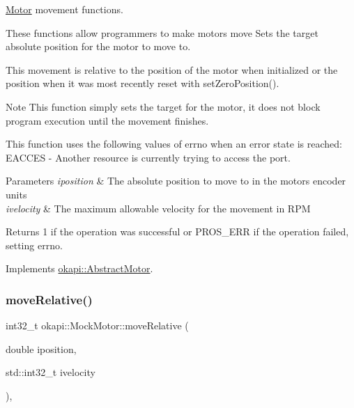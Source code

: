 \mbox{\hyperlink{classokapi_1_1Motor}{Motor}} movement functions. 

These functions allow programmers to make motors move Sets the target absolute position for the motor to move to.

This movement is relative to the position of the motor when initialized or the position when it was most recently reset with set\+Zero\+Position().

\begin{DoxyNote}{Note}
This function simply sets the target for the motor, it does not block program execution until the movement finishes.
\end{DoxyNote}
This function uses the following values of errno when an error state is reached\+: E\+A\+C\+C\+ES -\/ Another resource is currently trying to access the port.


\begin{DoxyParams}{Parameters}
{\em iposition} & The absolute position to move to in the motor\textquotesingle{}s encoder units \\
\hline
{\em ivelocity} & The maximum allowable velocity for the movement in R\+PM \\
\hline
\end{DoxyParams}
\begin{DoxyReturn}{Returns}
1 if the operation was successful or P\+R\+O\+S\+\_\+\+E\+RR if the operation failed, setting errno. 
\end{DoxyReturn}


Implements \mbox{\hyperlink{classokapi_1_1AbstractMotor_ab84ff0f3e39fa14dcf74bcc867863ff8}{okapi\+::\+Abstract\+Motor}}.

\mbox{\label{classokapi_1_1MockMotor_a5a03f26aadb6f40860dc5363f91863b2}} 
\subsubsection{\texorpdfstring{moveRelative()}{moveRelative()}}
{\footnotesize\ttfamily int32\+\_\+t okapi\+::\+Mock\+Motor\+::move\+Relative (\begin{DoxyParamCaption}\item[{double}]{iposition,  }\item[{std\+::int32\+\_\+t}]{ivelocity }\end{DoxyParamCaption})\hspace{0.3cm}{\ttfamily [override]}, {\ttfamily [virtual]}}



